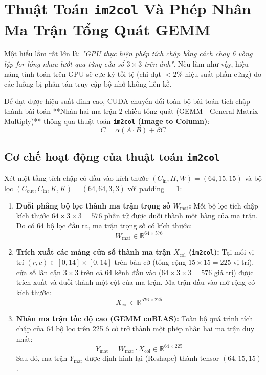 \documentclass[11pt,a4paper]{report}
\begin{document}
\section{Thuật Toán \texttt{im2col} Và Phép Nhân Ma Trận Tổng Quát GEMM}

Một hiểu lầm rất lớn là: \textit{"GPU thực hiện phép tích chập bằng cách chạy 6 vòng lặp for lồng nhau lướt qua từng cửa sổ $3 \times 3$ trên ảnh"}. Nếu làm như vậy, hiệu năng tính toán trên GPU sẽ cực kỳ tồi tệ (chỉ đạt $< 2\%$ hiệu suất phần cứng) do các luồng bị phân tán truy cập bộ nhớ không liền kề.

Để đạt được hiệu suất đỉnh cao, CUDA chuyển đổi toàn bộ bài toán tích chập thành bài toán **Nhân hai ma trận 2 chiều tổng quát (GEMM - General Matrix Multiply)** thông qua thuật toán \textbf{\texttt{im2col} (Image to Column)}:
\begin{equation}
    C = \alpha (A \cdot B) + \beta C
\end{equation}

\subsection{Cơ chế hoạt động của thuật toán \texttt{im2col}}
Xét một tầng tích chập có đầu vào kích thước $(C_{\text{in}}, H, W) = (64, 15, 15)$ và bộ lọc $(C_{\text{out}}, C_{\text{in}}, K, K) = (64, 64, 3, 3)$ với padding $= 1$:
\begin{enumerate}
    \item \textbf{Duỗi phẳng bộ lọc thành ma trận trọng số $W_{\text{mat}}$:}
    Mỗi bộ lọc tích chập kích thước $64 \times 3 \times 3 = 576$ phần tử được duỗi thành một hàng của ma trận. Do có 64 bộ lọc đầu ra, ma trận trọng số có kích thước:
    \begin{equation}
        W_{\text{mat}} \in \mathbb{R}^{64 \times 576}
    \end{equation}
    \item \textbf{Trích xuất các mảng cửa sổ thành ma trận $X_{\text{col}}$ (\texttt{im2col}):}
    Tại mỗi vị trí $(r, c) \in [0, 14] \times [0, 14]$ trên bàn cờ (tổng cộng $15 \times 15 = 225$ vị trí), cửa sổ lân cận $3 \times 3$ trên cả 64 kênh đầu vào ($64 \times 3 \times 3 = 576$ giá trị) được trích xuất và duỗi thành một cột của ma trận. Ma trận đầu vào mở rộng có kích thước:
    \begin{equation}
        X_{\text{col}} \in \mathbb{R}^{576 \times 225}
    \end{equation}
    \item \textbf{Nhân ma trận tốc độ cao (GEMM cuBLAS):}
    Toàn bộ quá trình tích chập của 64 bộ lọc trên 225 ô cờ trở thành một phép nhân hai ma trận duy nhất:
    \begin{equation}
        Y_{\text{mat}} = W_{\text{mat}} \cdot X_{\text{col}} \in \mathbb{R}^{64 \times 225}
    \end{equation}
    Sau đó, ma trận $Y_{\text{mat}}$ được định hình lại (Reshape) thành tensor $(64, 15, 15)$.
\end{enumerate}
\end{document}
